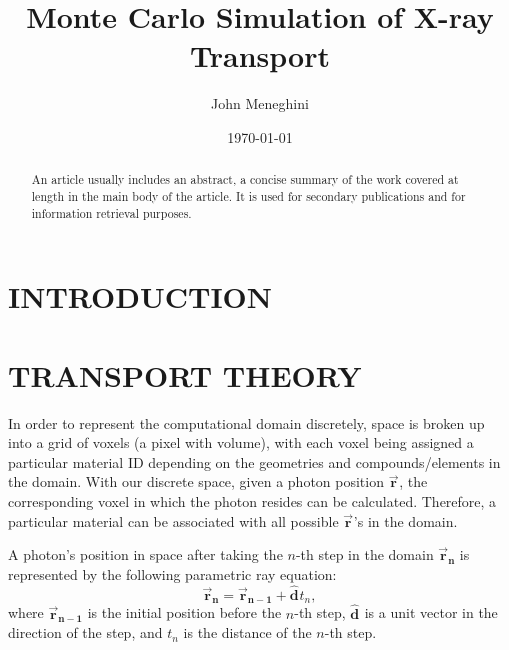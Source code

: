\documentclass[%
 aip,
cp,  %
 amsmath,amssymb,%
reprint,%
]{revtex4-2}
\newcommand{\vecb}[3]{
\bm{\vec{#1}_{#2}^{#3}}
}
\newcommand{\uvecb}[3]{
\bm{\hat{#1}_{#2}^{#3}}
}
\begin{document}
\title{Monte Carlo Simulation of X-ray Transport}%

\author{John Meneghini} %

\date{\today} %

\begin{abstract}
An article usually includes an abstract, a concise summary of the work
covered at length in the main body of the article. It is used for
secondary publications and for information retrieval purposes.
\end{abstract}

\maketitle

\section{INTRODUCTION}



\section{TRANSPORT THEORY}
\par In order to represent the computational domain discretely, space is broken up into a grid of voxels (a pixel with volume), with each voxel being assigned a particular material ID depending on the geometries and compounds/elements in the domain. With our discrete space, given a photon position $\vecb{r}{}{}$, the corresponding voxel in which the photon resides can be calculated. Therefore, a particular material can be associated with all possible $\vecb{r}{}{}$'s in the domain.

\par A photon's position in space after taking the $n$-th step in the domain $\vecb{r}{n}{}$ is represented by the following parametric ray equation:
\begin{equation}\label{eq:1}
    \vecb{r}{n}{} = \vecb{r}{n-1}{} + \uvecb{d}{}{} t_n,
\end{equation}
where $\vecb{r}{n-1}{}$ is the initial position before the $n$-th step, $\uvecb{d}{}{}$ is a unit vector in the direction of the step, and $t_n$ is the distance of the $n$-th step.
\end{document}

